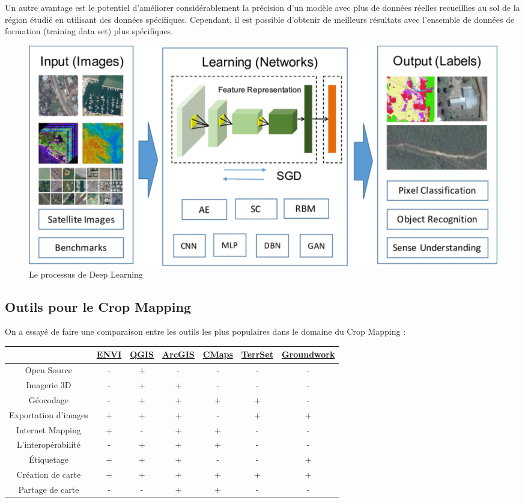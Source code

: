 \documentclass[12pt, openany]{report}
\begin{document}
Un autre avantage est le potentiel d'améliorer considérablement la précision d'un modèle avec plus de données réelles recueillies au sol de la région étudié en utilisant des données spécifiques. Cependant, il est possible d'obtenir de meilleurs résultats avec l'ensemble de données de formation (training data set) plus spécifiques.

\begin{figure}[H]
\centering
\includegraphics[scale=0.5]{deep.png}
\caption{Le processus de Deep Learning}
\end{figure}

\subsection{Outils pour le Crop Mapping}

On a essayé de faire une comparaison entre les outils les plus populaires dans le domaine du Crop Mapping :

{\setlength{\tabulinesep}{3pt}
\begin{tabu}{|c|c|c|c|c|c|c|}
\hline
{}&\href{https://www.harrisgeospatial.com/Software-Technology/ENVI}{ENVI}&\href{https://qgis.org/fr/site/}{QGIS}&\href{https://www.arcgis.com/index.html}{ArcGIS}&\href{https://cmapsconnect.com/}{CMaps}&\href{https://clarklabs.org/terrset/}{TerrSet}&\href{https://groundwork.azavea.com/}{Groundwork}\\
\hline
Open Source & - & + & - & - & - & -\\
\hline
Imagerie 3D & - & + & + & - & - & -\\
\hline
Géocodage & - & + & + & + & + & -\\
\hline
Exportation d'images & + & + & + & - & + & +\\
\hline
Internet Mapping & + & - & + & + & - & -\\
\hline
L'interopérabilité & - & + & + & + & - & -\\
\hline
Étiquetage & + & + & + & - & - & +\\
\hline
Création de carte & + & + & + & + & + & +\\
\hline
Partage de carte & - & - & + & + & - & -\\
\hline
\end{tabu}}\\
\end{document}
